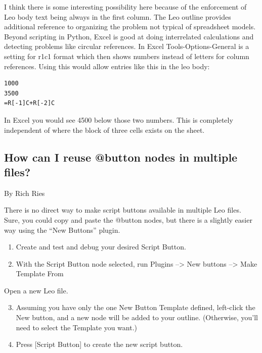 \documentclass[a4paper,10pt,english]{sphinxmanual}
\begin{document}
I think there is some interesting possibility here because of the enforcement of
Leo body text being always in the first column. The Leo outline provides
additional reference to organizing the problem not typical of spreadsheet
models. Beyond scripting in Python, Excel is good at doing interrelated
calculations and detecting problems like circular references. In Excel
Tools-Options-General is a setting for r1c1 format which then shows numbers
instead of letters for column references. Using this would allow entries like
this in the leo body:

\begin{Verbatim}[commandchars=\\\{\}]
1000
3500
=R[-1]C+R[-2]C
\end{Verbatim}

In Excel you would see 4500 below those two numbers. This is completely
independent of where the block of three cells exists on the sheet.


\subsection{How can I reuse @button nodes in multiple files?}
\label{FAQ:how-can-i-reuse-button-nodes-in-multiple-files}
By Rich Ries

There is no direct way to make script buttons available in multiple Leo files.
Sure, you could copy and paste the @button nodes, but there is a slightly
easier way using the ``New Buttons'' plugin.
\begin{enumerate}
\item {} 
Create and test and debug your desired Script Button.

\item {} 
With the Script Button node selected, run Plugins --\textgreater{} New buttons --\textgreater{} Make Template From

\end{enumerate}

Open a new Leo file.
\begin{enumerate}
\setcounter{enumi}{2}
\item {} 
Assuming you have only the one New Button Template defined, left-click the
New button, and a new node will be added to your outline. (Otherwise, you'll
need to select the Template you want.)

\item {} 
Press {[}Script Button{]} to create the new script button.

\end{enumerate}
\end{document}
